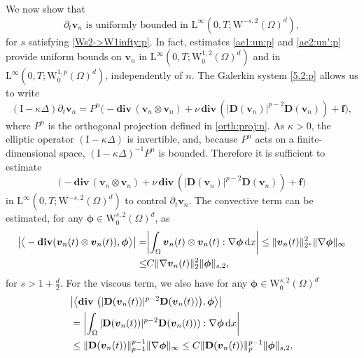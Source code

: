 \documentclass[12pt,reqno]{amsart}
\numberwithin{equation}{section}
\let\originalleft\left
\let\originalright\right
\renewcommand{\left}{\mathopen{}\mathclose\bgroup\originalleft}
\renewcommand{\right}{\aftergroup\egroup\originalright}
\theoremstyle{definition}
\def\divv{\mathbf{div}\,}
\def\I{\mathrm{I}}
\def\W{\mathrm{W}}
\def\L{\mathrm{L}}
\def\vv{\boldsymbol{v}}
\def\f{\boldsymbol{f}}
\begin{document}
We now show that
\begin{equation}\label{ub:comp}
\mbox{$\partial_t \vv_n$ \ is uniformly bounded in \ $\L^\infty(0,T;\W^{-s,2}(\Omega)^d)$},
\end{equation}
for $s$ satisfying \eqref{Ws2->W1infty:p}.
In fact, estimates \eqref{ae1:un:p} and \eqref{ae2:un':p} provide uniform bounds on $\vv_n$ in $\L^\infty(0,T; \W^{1,2}_0(\Omega)^d)$ and in $\L^\infty(0,T; \W^{1,p}_0(\Omega)^d)$, independently of $n$.
The Galerkin system \eqref{5.2:p} allows us to write
\begin{equation*}
(\I - \kappa \Delta) \partial_t \vv_n = P^n \Big( - \divv\!(\vv_n \otimes \vv_n) + \nu\, \divv\!(|\mathbf{D}(\vv_n)|^{p-2} \mathbf{D}(\vv_n)) + \f \Big),
\end{equation*}
where $P^n$ is the orthogonal projection defined in \eqref{orth:proj:n}.
As $\kappa>0$, the elliptic operator $(\I - \kappa \Delta)$ is invertible, and, because $P^n$ acts on a finite-dimensional space, $(\I - \kappa \Delta)^{-1} P^n$ is bounded.
Therefore it is sufficient to estimate
\begin{equation}\label{Gal:n:dt:1}
\Big( - \divv\!(\vv_n \otimes \vv_n) + \nu\,\divv\!(|\mathbf{D}(\vv_n)|^{p-2} \mathbf{D}(\vv_n)) + \f \Big)
\end{equation}
in $\L^\infty(0,T;\W^{-s,2}(\Omega)^d)$ to control $\partial_t \vv_n$.
The convective term can be estimated, for any
$\boldsymbol{\phi} \in \W_0^{s,2}(\Omega)^d$, as
\begin{equation}\label{Gal:n:dt:2}
\begin{split}
\left|\big\langle - \divv\!(\vv_n(t) \otimes \vv_n(t)), \boldsymbol{\phi} \big\rangle\right|
= & \left|\int_\Omega \vv_n(t) \otimes \vv_n(t):\nabla\boldsymbol{\phi} \,\mathrm{d}x \right|
\leq \|\vv_n(t)\|_{2^\ast}^2\|\nabla\boldsymbol{\phi}\|_{\infty} \\
\leq  & C\|\nabla\vv_n(t)\|_{2}^2\|\boldsymbol{\phi}\|_{s,2},
\end{split}
\end{equation}
for  $s>1+\frac{d}{2}$.
For the viscous term, we also have for any
$\boldsymbol{\phi} \in \W_0^{s,2}(\Omega)^d$
\begin{equation}\label{Gal:n:dt:3}
\begin{split}
&\left|\big\langle\divv\,\left(|\mathbf{D}(\vv_n(t))|^{p-2} \mathbf{D}(\vv_n(t))\right), \boldsymbol{\phi} \big\rangle\right|
 \\&= \left|\int_\Omega |\mathbf{D}(\vv_n(t))|^{p-2} \mathbf{D}(\vv_n(t))):\nabla\boldsymbol{\phi} \,\mathrm{d}x \right| \\
&\leq  \|\mathbf{D}(\vv_n(t))\|_{p-1}^{p-1}\|\nabla\boldsymbol{\phi}\|_{\infty}
\leq  C\|\mathbf{D}(\vv_n(t))\|_{p}^{p-1}\|\boldsymbol{\phi}\|_{s,2},
\end{split}
\end{equation}
\end{document}
